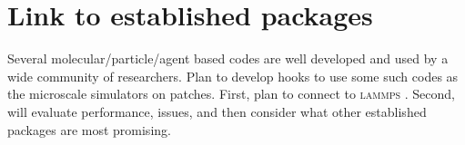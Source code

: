 \section{Link to established packages}

Several molecular\slash particle\slash agent based codes are well developed and used by a wide community of researchers.  
Plan to develop hooks to use some such codes as the microscale simulators on patches.
First, plan to connect to \textsc{lammps} \cite[]{LAMMPS}.
Second, will evaluate performance, issues, and then consider what other established packages are most promising.

